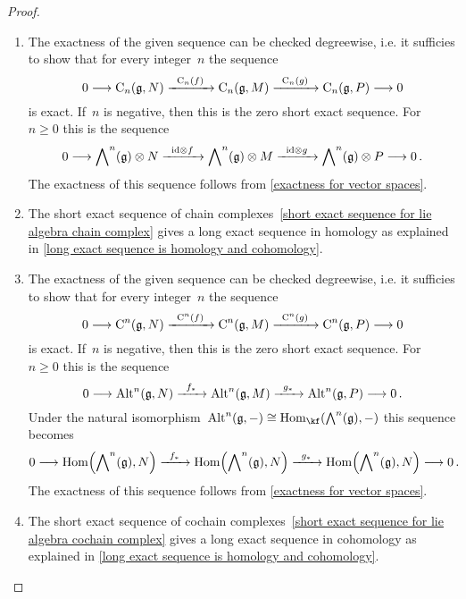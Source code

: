 \begin{proof}
	\leavevmode
	\begin{enumerate}
		\item
			The exactness of the given sequence can be checked degreewise, i.e. it sufficies to show that for every integer~$n$ the sequence
			\[
				0
				\to
				\Chain_n(\glie, N)
				\xto{\Chain_n(f)}
				\Chain_n(\glie, M)
				\xto{\Chain_n(g)}
				\Chain_n(\glie, P)
				\to
				0
			\]
			is exact.
			If~$n$ is negative, then this is the zero short exact sequence.
			For~$n \geq 0$ this is the sequence
			\[
				0
				\to
				\Exterior^n(\glie) \tensor N
				\xto{\id \tensor f}
				\Exterior^n(\glie) \tensor M
				\xto{\id \tensor g}
				\Exterior^n(\glie) \tensor P
				\to
				0 \,.
			\]
			The exactness of this sequence follows from \cref{exactness for vector spaces}.
		\item
			The short exact sequence of chain complexes~\eqref{short exact sequence for lie algebra chain complex} gives a long exact sequence in homology as explained in \cref{long exact sequence is homology and cohomology}.
		\item
			The exactness of the given sequence can be checked degreewise, i.e. it sufficies to show that for every integer~$n$ the sequence
			\[
				0
				\to
				\Chain^n(\glie, N)
				\xto{\Chain^n(f)}
				\Chain^n(\glie, M)
				\xto{\Chain^n(g)}
				\Chain^n(\glie, P)
				\to
				0
			\]
			is exact.
			If~$n$ is negative, then this is the zero short exact sequence.
			For~$n \geq 0$ this is the sequence
			\[
				0
				\to
				\Alt^n(\glie, N)
				\xto{f_*}
				\Alt^n(\glie, M)
				\xto{g_*}
				\Alt^n(\glie, P)
				\to
				0 \,.
			\]
			Under the natural isomorphism~$\Alt^n(\glie, \ph) \cong \Hom_{\kf}( \Exterior^n(\glie), \ph)$ this sequence becomes
			\[
				0
				\to
				\Hom\Bigl( \Exterior^n(\glie), N \Bigr)
				\xto{f_*}
				\Hom\Bigl( \Exterior^n(\glie), N \Bigr)
				\xto{g_*}
				\Hom\Bigl( \Exterior^n(\glie), N \Bigr)
				\to
				0 \,.
			\]
			The exactness of this sequence follows from \cref{exactness for vector spaces}.
		\item
			The short exact sequence of cochain complexes~\eqref{short exact sequence for lie algebra cochain complex} gives a long exact sequence in cohomology as explained in \cref{long exact sequence is homology and cohomology}.
		\qedhere
	\end{enumerate}
\end{proof}





